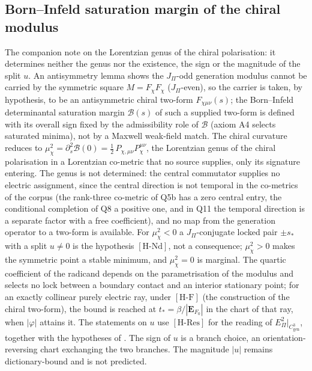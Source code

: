 \documentclass[11pt,a4paper]{article}
\theoremstyle{definition}
\newcommand{\Epi}{E_\Pi}
\newcommand{\Cgen}{C^3_{\mathrm{gen}}}
\newcommand{\HRes}{\ensuremath{[\mathrm{H\text{-}Res}]}}
\newcommand{\HNd}{\ensuremath{[\mathrm{H\text{-}Nd}]}}
\newcommand{\HF}{\ensuremath{[\mathrm{H\text{-}F}]}}
\begin{document}
    \subsection{Born--Infeld saturation margin of the chiral modulus~\cite{Beau2026bim}}
      The companion note on the Lorentzian genus of the chiral polarisation: it determines neither the genus nor the
      existence, the sign or the magnitude of the split $u$.
      An antisymmetry lemma shows the $J_\Pi$-odd generation modulus cannot be carried by the symmetric square
      $M=F_\chi F_\chi$ ($J_\Pi$-even), so the carrier is taken, by hypothesis, to be an antisymmetric chiral two-form
      $F_{\chi\mu\nu}(s)$; the Born--Infeld determinantal saturation margin $\mathcal B(s)$ of such a supplied two-form is
      defined with its overall sign fixed by the admissibility role of $\mathcal B$ (axiom A4 selects saturated
      minima), not by a Maxwell weak-field match.
      The chiral curvature reduces to $\mu_\chi^2=\partial_s^2\mathcal B(0)=\tfrac12\,P_{\chi,\mu\nu}
      P_\chi^{\mu\nu}$, the Lorentzian genus of the chiral polarisation in a Lorentzian co-metric that no source
      supplies, only its signature entering.
      The genus is not determined: the central commutator supplies no electric assignment, since the central direction
      is not temporal in the co-metrics of the corpus (the rank-three co-metric of Q5b has a zero central entry, the
      conditional completion of Q8 a positive one, and in Q11 the temporal direction is a separate factor with a free
      coefficient), and no map from the generation
      operator to a two-form is available.
      For $\mu_\chi^2<0$ a $J_\Pi$-conjugate locked pair $\pm s_*$ with a split $u\neq0$ is the hypothesis \HNd{}, not a
      consequence; $\mu_\chi^2>0$ makes the symmetric point a stable minimum, and $\mu_\chi^2=0$ is marginal.
      The quartic coefficient of the radicand depends on the parametrisation of the modulus and selects no lock between
      a boundary contact and an interior stationary point; for an exactly collinear purely electric ray, under \HF{} (the construction of the chiral two-form),
      the bound is reached at $t_*=\beta/|\mathbf{E}_{F_0}|$ in the chart of that ray, when $|\varphi|$ attains it.
      The statements on $u$ use \HRes{} for the reading of $\Epi^2|_{\Cgen}$, together with the hypotheses of
      \cite{Beau2026prs}.
      The sign of $u$ is a branch choice, an orientation-reversing chart exchanging the two branches.
      The magnitude $|u|$ remains dictionary-bound and is not predicted.
\end{document}
